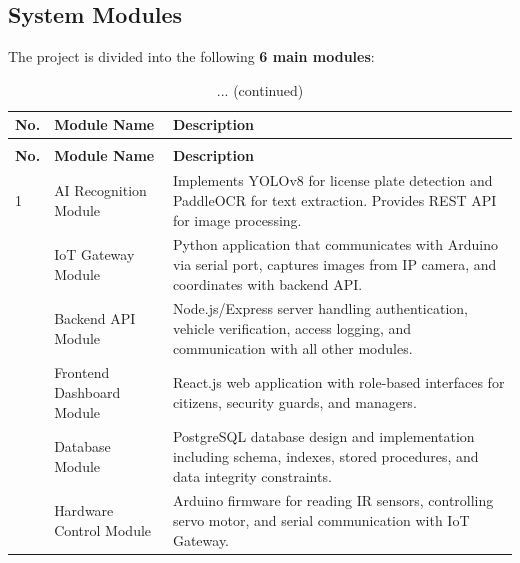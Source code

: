 \documentclass[a4paper]{article}
\begin{document}
\subsection{System Modules}
The project is divided into the following \textbf{6 main modules}:

\begin{longtable}{@{}
    >{\centering\arraybackslash}p{}
    >{\raggedright\arraybackslash}p{}
    p{} @{}}

    \caption{System Modules}
    \label{tab:system_modules} \\

    \toprule
    \textbf{No.} & \textbf{Module Name} & \textbf{Description} \\
    \midrule
    \endfirsthead

    \caption[]{... (continued)} \\
    \toprule
    \textbf{No.} & \textbf{Module Name} & \textbf{Description} \\
    \midrule
    \endhead

    \bottomrule
    \endlastfoot

    1 & AI Recognition Module & Implements YOLOv8 for license plate detection and PaddleOCR for text extraction. Provides REST API for image processing. \\
    \addlinespace
    2 & IoT Gateway Module & Python application that communicates with Arduino via serial port, captures images from IP camera, and coordinates with backend API. \\
    \addlinespace
    3 & Backend API Module & Node.js/Express server handling authentication, vehicle verification, access logging, and communication with all other modules. \\
    \addlinespace
    4 & Frontend Dashboard Module & React.js web application with role-based interfaces for citizens, security guards, and managers. \\
    \addlinespace
    5 & Database Module & PostgreSQL database design and implementation including schema, indexes, stored procedures, and data integrity constraints. \\
    \addlinespace
    6 & Hardware Control Module & Arduino firmware for reading IR sensors, controlling servo motor, and serial communication with IoT Gateway. \\
\end{longtable}
\end{document}
